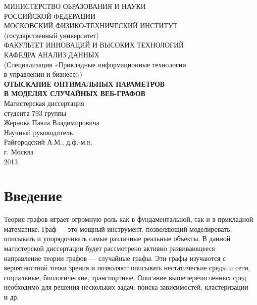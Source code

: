 \documentclass[14pt]{extreport}
\begin{document}

\begin{center}
МИНИСТЕРСТВО ОБРАЗОВАНИЯ И НАУКИ\\ РОССИЙСКОЙ ФЕДЕРАЦИИ\\[0.5cm]

МОСКОВСКИЙ ФИЗИКО-ТЕХНИЧЕСКИЙ ИНСТИТУТ\\
(государственный университет)\\[0.5cm]

ФАКУЛЬТЕТ ИННОВАЦИЙ И ВЫСОКИХ ТЕХНОЛОГИЙ\\
КАФЕДРА АНАЛИЗ ДАННЫХ\\[0.5cm]

(Специализация «Прикладные информационные технологии\\
в управлении и бизнесе»)\\[1.5cm]

{\bf ОТЫСКАНИЕ ОПТИМАЛЬНЫХ ПАРАМЕТРОВ}\\
{\bf В МОДЕЛЯХ СЛУЧАЙНЫХ ВЕБ-ГРАФОВ}\\[1.5cm]

Магистерская диссертация\\
студента 793 группы\\
Жернова Павла Владимировича\\[1.5cm]

Научный руководитель\\
Райгородский А.М., д.ф.-м.н.\\[3cm]


г. Москва\\
2013
\end{center}
\newpage
{} 
\setcounter{page}{2}
\tableofcontents
\newpage

\chapter{Введение}

Теория графов играет огромную роль как в фундаментальной, так и в прикладной математике. Граф --- это мощный инструмент, позволяющий моделировать, описывать и упорядочивать самые различные реальные объекты. В данной магистерской диссертации будет рассмотрено активно развивающееся направление теории графов --- случайные графы.  Эти графы изучаются с вероятностной точки зрения и позволяют описывать нестатические среды и сети, социальные, биологические, транспортные. Описание вышеперечисленных сред необходимо для решения нескольких задач: поиска зависимостей, кластеризации и др.
\end{document}
